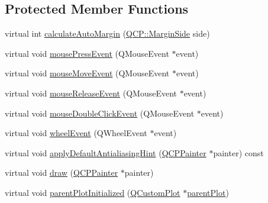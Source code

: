 \subsection*{Protected Member Functions}
\begin{DoxyCompactItemize}
\item 
virtual int \hyperlink{class_q_c_p_layout_element_a005c9f0fe84bc1591a2cf2c46fd477b4}{calculate\+Auto\+Margin} (\hyperlink{namespace_q_c_p_a7e487e3e2ccb62ab7771065bab7cae54}{Q\+C\+P\+::\+Margin\+Side} side)
\item 
virtual void \hyperlink{class_q_c_p_layout_element_a2d82ea21fe0ee628f177bd824bc51a71}{mouse\+Press\+Event} (Q\+Mouse\+Event $\ast$event)
\item 
virtual void \hyperlink{class_q_c_p_layout_element_a14f4acf58cdb8dd2c6c571479c4c4a40}{mouse\+Move\+Event} (Q\+Mouse\+Event $\ast$event)
\item 
virtual void \hyperlink{class_q_c_p_layout_element_ae526ac828cce1e5bb94eaa85776d7404}{mouse\+Release\+Event} (Q\+Mouse\+Event $\ast$event)
\item 
virtual void \hyperlink{class_q_c_p_layout_element_aa8fef6486cb6ceb7c82cbdd50bc32ee9}{mouse\+Double\+Click\+Event} (Q\+Mouse\+Event $\ast$event)
\item 
virtual void \hyperlink{class_q_c_p_layout_element_a300521d2fd18a893c1b85f6be11ce2bf}{wheel\+Event} (Q\+Wheel\+Event $\ast$event)
\item 
virtual void \hyperlink{class_q_c_p_layout_element_ad6d2b4bb0291c2441b2e1ca3d5296df5}{apply\+Default\+Antialiasing\+Hint} (\hyperlink{class_q_c_p_painter}{Q\+C\+P\+Painter} $\ast$painter) const 
\item 
virtual void \hyperlink{class_q_c_p_layout_element_a547bcc1e6e2be5645ca781efe0834653}{draw} (\hyperlink{class_q_c_p_painter}{Q\+C\+P\+Painter} $\ast$painter)
\item 
virtual void \hyperlink{class_q_c_p_layout_element_a1478899e80e8244b411e96ec3b2e5ce2}{parent\+Plot\+Initialized} (\hyperlink{class_q_custom_plot}{Q\+Custom\+Plot} $\ast$\hyperlink{class_q_c_p_layerable_ab7e0e94461566093d36ffc0f5312b109}{parent\+Plot})
\end{DoxyCompactItemize}
